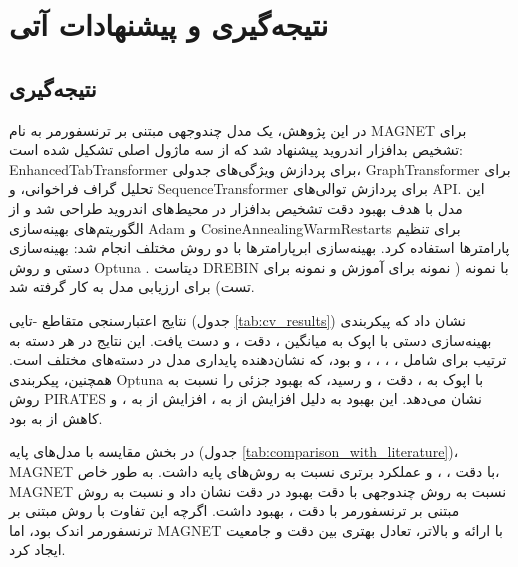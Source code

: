 \clearpage
\thispagestyle{empty}
\chapter{نتیجه‌گیری و پیشنهادات آتی}\label{chap5}

\section{نتیجه‌گیری}
در این پژوهش، یک مدل چندوجهی مبتنی بر ترنسفورمر به نام MAGNET برای تشخیص بدافزار اندروید پیشنهاد شد که از سه ماژول اصلی تشکیل شده است: EnhancedTabTransformer برای پردازش ویژگی‌های جدولی، GraphTransformer برای تحلیل گراف فراخوانی، و SequenceTransformer برای پردازش توالی‌های API. این مدل با هدف بهبود دقت تشخیص بدافزار در محیط‌های اندروید طراحی شد و از الگوریتم‌های بهینه‌سازی Adam و CosineAnnealingWarmRestarts برای تنظیم پارامترها استفاده کرد. بهینه‌سازی ابرپارامترها با دو روش مختلف انجام شد: بهینه‌سازی دستی و روش Optuna \cite{Optuna2019}. دیتاست DREBIN \cite{Drebin} با  نمونه ( نمونه برای آموزش و  نمونه برای تست) برای ارزیابی مدل به کار گرفته شد.

نتایج اعتبارسنجی متقاطع -تایی (جدول \ref{tab:cv_results}) نشان داد که پیکربندی بهینه‌سازی دستی با  اپوک به میانگین  ، دقت ، و   دست یافت. این نتایج در هر دسته به ترتیب برای  شامل ، ، ، ، و  بود، که نشان‌دهنده پایداری مدل در دسته‌های مختلف است. همچنین، پیکربندی Optuna با  اپوک به  ، دقت ، و   رسید، که بهبود جزئی را نسبت به روش PIRATES نشان می‌دهد. این بهبود به دلیل افزایش  از  به ، افزایش  از  به ، و کاهش  از  به  بود.

در بخش مقایسه با مدل‌های پایه (جدول \ref{tab:comparison_with_literature})، MAGNET با دقت ،  ، و   عملکرد برتری نسبت به روش‌های پایه داشت. به طور خاص، MAGNET نسبت به روش چندوجهی \cite{Alsaleh2023} با دقت  بهبود  در دقت نشان داد و نسبت به روش مبتنی بر ترنسفورمر \cite{TransformerMalware} با دقت ، بهبود  داشت. اگرچه این تفاوت با روش مبتنی بر ترنسفورمر اندک بود، اما MAGNET با ارائه  و  بالاتر، تعادل بهتری بین دقت و جامعیت ایجاد کرد.

